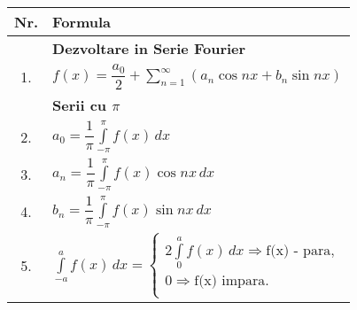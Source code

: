 \documentclass{article}
\begin{document}
\setlength{\extrarowheight}{10pt}

\begin{table}[!ht]
    \begin{minipage}{0.5\linewidth}
        \centering
        \begin{tabularx}{\linewidth}{|c|X|}
            \hline
            \textbf{Nr.} & \textbf{Formula}                                                                                                                           \\
            \hline
                         & \textbf{Dezvoltare in Serie Fourier}                                                                                                       \\
            \hline
            1.           & $ f(x) = \dfrac{a_0}{2} +\displaystyle\sum\limits_{n = 1}^{\infty} \left(a_n \cos nx + b_n \sin nx\right)  $                               \\
            \hline
                         & \textbf{Serii cu $\pi$}                                                                                                                    \\
            \hline
            2.           & $ a_0 = \dfrac{1}{\pi} \displaystyle\int\limits_{-\pi}^{\pi} f(x) \,dx $                                                                   \\
            \hline
            3.           & $ a_n = \dfrac{1}{\pi} \displaystyle\int\limits_{-\pi}^{\pi} f(x) \cos nx \,dx $                                                           \\
            \hline
            4.           & $ b_n = \dfrac{1}{\pi} \displaystyle\int\limits_{-\pi}^{\pi} f(x) \sin nx \,dx $                                                           \\
            \hline
            5.           & $ \displaystyle\int\limits_{-a}^{a} f(x) \,dx =
                \begin{cases}
                    2\displaystyle\int\limits_{0}^{a} f(x) \,dx \Rightarrow \text{f(x) - para}, \\
                    0 \Rightarrow \text{f(x)  impara}.                                          \\
                \end{cases}
            $                                                                                                                                                         \\

\end{tabularx}
\end{minipage}
\end{table}
\end{document}
